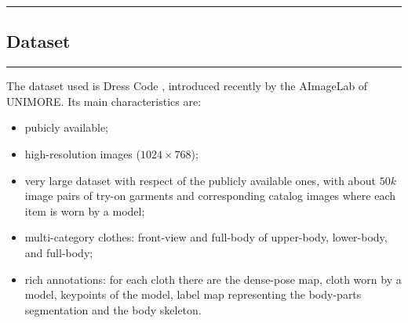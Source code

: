{\color{gray}\hrule}
\begin{center}
\section{Dataset}
\end{center}
{\color{gray}\hrule}


The dataset used is Dress Code \cite{dress-code}, introduced recently by the AImageLab of UNIMORE. Its main characteristics are:
\begin{itemize}[noitemsep]

\item pubicly available;

\item high-resolution images ($1024 \times 768$);

\item very large dataset with respect of the publicly available ones, with about $50k$ image pairs of try-on garments and corresponding catalog images where each item is worn by a model;

\item multi-category clothes: front-view and full-body of upper-body, lower-body, and full-body;

\item rich annotations: for each cloth there are the dense-pose map, cloth worn by a model, keypoints of the model, label map representing the body-parts segmentation and the body skeleton.

\end{itemize}

